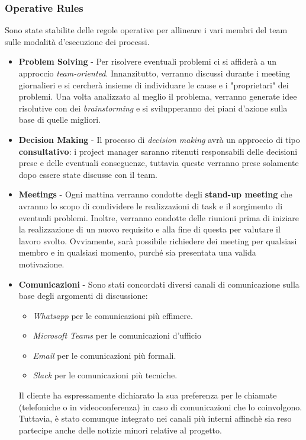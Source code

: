 \subsubsection{Operative Rules}
Sono state stabilite delle regole operative per allineare i vari membri del team sulle modalità d'esecuzione dei processi.
\begin{itemize}
    \item \textbf{Problem Solving} - Per risolvere eventuali problemi ci si affiderà a un approccio \textit{team-oriented}. Innanzitutto, verranno discussi durante i meeting giornalieri e si cercherà insieme di individuare le cause e i "proprietari" dei problemi. Una volta analizzato al meglio il problema, verranno generate idee risolutive con dei \textit{brainstorming} e si svilupperanno dei piani d'azione sulla base di quelle migliori.
    \item \textbf{Decision Making} - Il processo di \textit{decision making} avrà un approccio di tipo \textbf{consultativo}: i project manager saranno ritenuti responsabili delle decisioni prese e delle eventuali conseguenze, tuttavia queste verranno prese solamente dopo essere state discusse con il team.
    \item \textbf{Meetings} - Ogni mattina verranno condotte degli \textbf{stand-up meeting} che avranno lo scopo di condividere le realizzazioni di task e il sorgimento di eventuali problemi. Inoltre, verranno condotte delle riunioni prima di iniziare la realizzazione di un nuovo requisito e alla fine di questa per valutare il lavoro svolto. Ovviamente, sarà possibile richiedere dei meeting per qualsiasi membro e in qualsiasi momento, purché sia presentata una valida motivazione.
    \item \textbf{Comunicazioni} - Sono stati concordati diversi canali di comunicazione sulla base degli argomenti di discussione:
    \begin{itemize}
        \item \textit{Whatsapp} per le comunicazioni più effimere.
        \item \textit{Microsoft Teams} per le comunicazioni d'ufficio
        \item \textit{Email} per le comunicazioni più formali.
        \item \textit{Slack} per le comunicazioni più tecniche.
    \end{itemize}
    Il cliente ha espressamente dichiarato la sua preferenza per le chiamate (telefoniche o in videoconferenza) in caso di comunicazioni che lo coinvolgono. Tuttavia, è stato comunque integrato nei canali più interni affinchè sia reso partecipe anche delle notizie minori relative al progetto.
\end{itemize}

